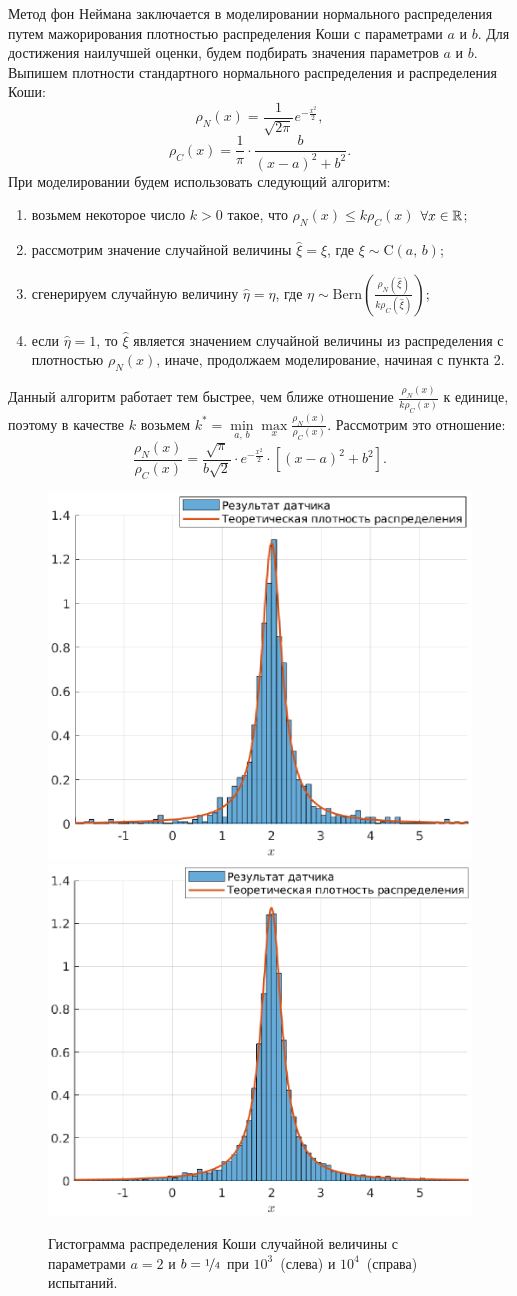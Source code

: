 Метод фон Неймана заключается в моделировании нормального распределения путем мажорирования плотностью распределения Коши с параметрами $a$ и $b$. Для достижения наилучшей оценки, будем подбирать значения параметров $a$ и $b$. Выпишем плотности стандартного нормального распределения и распределения Коши:
$$
        \rho_N(x) = \frac{1}{\sqrt{2\pi}} e^{-\frac{x^2}{2}},
$$
$$
        \rho_C(x) = \frac{1}{\pi}\cdot\frac{b}{(x-a)^2+b^2}.
$$
При моделировании будем использовать следующий алгоритм:
\begin{enumerate}
        \item возьмем некоторое число $k > 0$ такое, что $\rho_N(x) \leqslant k \rho_C(x)$ $\forall x \in \mathbb{R}$;
        \item рассмотрим значение случайной величины $\hat\xi = \xi$, где $\xi \sim \mbox{C}(a,\,b)$;
        \item сгенерируем случайную величину $\hat\eta = \eta$, где $\eta \sim \mbox{Bern}\left(\frac{\rho_N(\hat\xi)}{k\rho_C(\hat\xi)}\right)$;
        \item если $\hat\eta = 1$, то $\hat\xi$ является значением случайной величины из распределения с плотностью $\rho_N(x)$, иначе, продолжаем моделирование, начиная с пункта 2.
\end{enumerate}

Данный алгоритм работает тем быстрее, чем ближе отношение $\frac{\rho_N(x)}{k\rho_C(x)}$ к единице, поэтому в качестве $k$ возьмем $k^* = \min\limits_{a,\,b}\max\limits_{x}\frac{\rho_N(x)}{\rho_C(x)}$. Рассмотрим это отношение:
$$
        \frac{\rho_N(x)}{\rho_C(x)}
        =
        \frac{\sqrt{\pi}}{b\sqrt{2}}
        \cdot
        e^{-\frac{x^2}{2}}
        \cdot
        [(x - a)^2 + b^2].
$$



\clearpage
\begin{figure}[t]
        \includegraphics[width=0.5\linewidth]{task_04/c2-025-1000.eps}
        \includegraphics[width=0.5\linewidth]{task_04/c2-025-10000.eps}
        \caption{Гистограмма распределения Коши случайной величины с параметрами $a = 2$ и $b = \nicefrac{1}{4}$ при $10^3$~(слева) и $10^4$~(справа) испытаний.}
\end{figure}